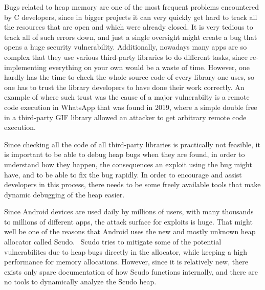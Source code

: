 \documentclass[a4paper,11pt,oneside]{report}
\begin{document}

Bugs related to heap memory are one of the most frequent problems encountered
by C developers, since in bigger projects it can very quickly get hard to track
all the resources that are open and which were already closed. It is very tedious
to track all of such errors down, and just a single oversight might create a bug
that opens a huge security vulnerability. Additionally, nowadays many apps are so
complex that they use various third-party libraries to do different tasks, since
re-implementing everything on your own would be a waste of time. However, one
hardly has the time to check the whole source code of every library one uses, so
one has to trust the library developers to have done their work correctly. An
example of where such trust was the cause of a major vulnerabilty is a remote
code execution in WhatsApp that was found in 2019, where a simple double free
in a third-party GIF library allowed an attacker to get arbitrary remote code
execution.~\cite{whatsappRCE}

Since checking all the code of all third-party libraries is practically not
feasible, it is important to be able to debug heap bugs when they are found, in
order to understand how they happen, the consequences an exploit using the
bug might have, and to be able to fix the bug rapidly. In order to encourage
and assist developers in this process, there needs to be some freely available
tools that make dynamic debugging of the heap easier.

Since Android devices are used daily by millions of users, with many thousands to
millions of different apps, the attack surface for exploits is huge. That might
well be one of the reasons that Android uses the new and mostly unknown heap
allocator called Scudo.~\cite{llvmScudo} Scudo tries to mitigate some of the potential
vulnerabilites due to heap bugs directly in the allocator, while keeping a high
performance for memory allocations. However, since it is relatively new, there
exists only spare documentation of how Scudo functions internally, and there
are no tools to dynamically analyze the Scudo heap.
\end{document}
